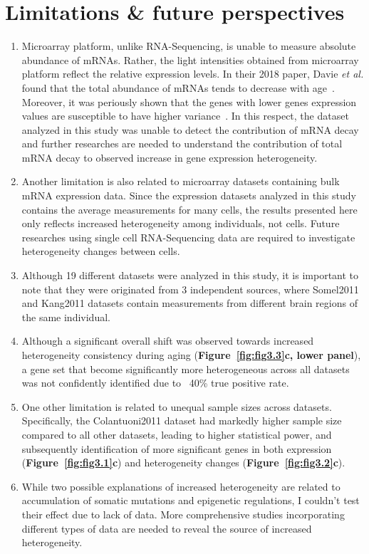 \section{Limitations \& future perspectives}
\begin{enumerate}
    \item Microarray platform, unlike RNA-Sequencing, is unable to measure absolute abundance of mRNAs. 
    Rather, the light intensities obtained from microarray platform reflect the relative expression levels.
    In their 2018 paper, Davie \textit{et al.} found that the total abundance of mRNAs tends to decrease with age~\cite{Davie2018}.
    Moreover, it was periously shown that the genes with lower genes expression values are susceptible to have higher variance~\cite{Aris2004}.
    In this respect, the dataset analyzed in this study was unable to detect the contribution of mRNA decay and
    further researches are needed to understand the contribution of total mRNA decay to observed increase in gene expression heterogeneity.
    \item Another limitation is also related to microarray datasets containing bulk mRNA expression data.
    Since the expression datasets analyzed in this study contains the average measurements for many cells,
    the results presented here only reflects increased heterogeneity among individuals, not cells.
    Future researches using single cell RNA-Sequencing data are required to investigate heterogeneity changes between cells.
    \item Although 19 different datasets were analyzed in this study, it is important to note that they were originated from 3 independent sources,
    where Somel2011 and Kang2011 datasets contain measurements from different brain regions of the same individual.
    \item Although a significant overall shift was observed towards increased heterogeneity consistency during aging (\textbf{Figure~\ref{fig:fig3.3}c, lower panel}),
    a gene set that become significantly more heterogeneous across all datasets was not confidently identified due to ~40\% true positive rate.
    \item One other limitation is related to unequal sample sizes across datasets. 
    Specifically, the Colantuoni2011 dataset had markedly higher sample size compared to all other datasets,
    leading to higher statistical power, and subsequently identification of more significant genes in both expression (\textbf{Figure~\ref{fig:fig3.1}c}) 
    and heterogeneity changes (\textbf{Figure~\ref{fig:fig3.2}c}).
    \item While two possible explanations of increased heterogeneity are related to accumulation of somatic mutations and epigenetic regulations,
    I couldn't test their effect due to lack of data. 
    More comprehensive studies incorporating different types of data are needed to reveal the source of increased heterogeneity.
\end{enumerate}
